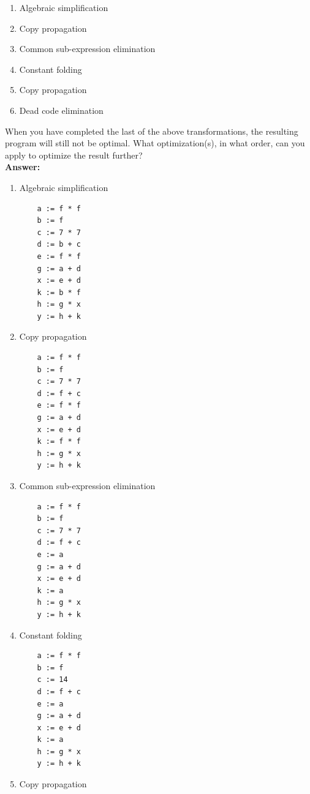 \documentclass[11pt]{article}
\begin{document}
\begin{enumerate}
  \begin{enumerate}
    \item Algebraic simplification
	
    \item Copy propagation
    \item Common sub-expression elimination
    \item Constant folding
    \item Copy propagation
    \item Dead code elimination
  \end{enumerate}

  
  When you have completed the last of the above transformations, the resulting program will still not be optimal. What optimization(s), in what order, can you apply to optimize the result further?\\
    \textbf{Answer:} 
 
    \begin{enumerate}
    \item Algebraic simplification
	  \begin{lstlisting}
    a := f * f
    b := f
    c := 7 * 7
    d := b + c
    e := f * f
    g := a + d
    x := e + d
    k := b * f
    h := g * x
    y := h + k
  \end{lstlisting}
  
    \item Copy propagation
	\begin{lstlisting}
    a := f * f
    b := f
    c := 7 * 7
    d := f + c
    e := f * f
    g := a + d
    x := e + d
    k := f * f
    h := g * x
    y := h + k
  \end{lstlisting}
  
    \item Common sub-expression elimination
	\begin{lstlisting}
    a := f * f
    b := f
    c := 7 * 7
    d := f + c
    e := a
    g := a + d
    x := e + d
    k := a
    h := g * x
    y := h + k
  \end{lstlisting}
  
  
    \item Constant folding
	\begin{lstlisting}
    a := f * f
    b := f
    c := 14
    d := f + c
    e := a
    g := a + d
    x := e + d
    k := a
    h := g * x
    y := h + k
  \end{lstlisting}
	
  
    \item Copy propagation
	

\end{enumerate}
\end{enumerate}
\end{document}
